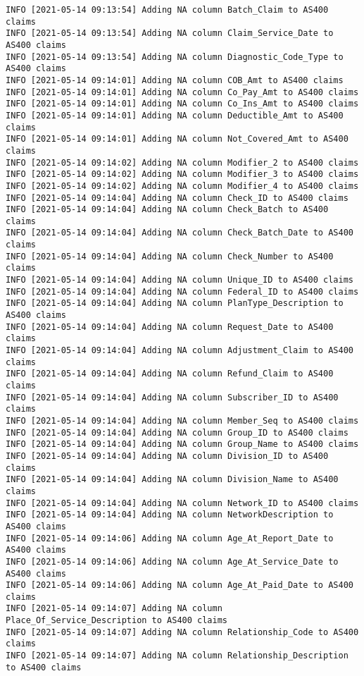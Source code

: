 \documentclass[
]{book}
\begin{document}
\begin{verbatim}
INFO [2021-05-14 09:13:54] Adding NA column Batch_Claim to AS400 claims
INFO [2021-05-14 09:13:54] Adding NA column Claim_Service_Date to AS400 claims
INFO [2021-05-14 09:13:54] Adding NA column Diagnostic_Code_Type to AS400 claims
INFO [2021-05-14 09:14:01] Adding NA column COB_Amt to AS400 claims
INFO [2021-05-14 09:14:01] Adding NA column Co_Pay_Amt to AS400 claims
INFO [2021-05-14 09:14:01] Adding NA column Co_Ins_Amt to AS400 claims
INFO [2021-05-14 09:14:01] Adding NA column Deductible_Amt to AS400 claims
INFO [2021-05-14 09:14:01] Adding NA column Not_Covered_Amt to AS400 claims
INFO [2021-05-14 09:14:02] Adding NA column Modifier_2 to AS400 claims
INFO [2021-05-14 09:14:02] Adding NA column Modifier_3 to AS400 claims
INFO [2021-05-14 09:14:02] Adding NA column Modifier_4 to AS400 claims
INFO [2021-05-14 09:14:04] Adding NA column Check_ID to AS400 claims
INFO [2021-05-14 09:14:04] Adding NA column Check_Batch to AS400 claims
INFO [2021-05-14 09:14:04] Adding NA column Check_Batch_Date to AS400 claims
INFO [2021-05-14 09:14:04] Adding NA column Check_Number to AS400 claims
INFO [2021-05-14 09:14:04] Adding NA column Unique_ID to AS400 claims
INFO [2021-05-14 09:14:04] Adding NA column Federal_ID to AS400 claims
INFO [2021-05-14 09:14:04] Adding NA column PlanType_Description to AS400 claims
INFO [2021-05-14 09:14:04] Adding NA column Request_Date to AS400 claims
INFO [2021-05-14 09:14:04] Adding NA column Adjustment_Claim to AS400 claims
INFO [2021-05-14 09:14:04] Adding NA column Refund_Claim to AS400 claims
INFO [2021-05-14 09:14:04] Adding NA column Subscriber_ID to AS400 claims
INFO [2021-05-14 09:14:04] Adding NA column Member_Seq to AS400 claims
INFO [2021-05-14 09:14:04] Adding NA column Group_ID to AS400 claims
INFO [2021-05-14 09:14:04] Adding NA column Group_Name to AS400 claims
INFO [2021-05-14 09:14:04] Adding NA column Division_ID to AS400 claims
INFO [2021-05-14 09:14:04] Adding NA column Division_Name to AS400 claims
INFO [2021-05-14 09:14:04] Adding NA column Network_ID to AS400 claims
INFO [2021-05-14 09:14:04] Adding NA column NetworkDescription to AS400 claims
INFO [2021-05-14 09:14:06] Adding NA column Age_At_Report_Date to AS400 claims
INFO [2021-05-14 09:14:06] Adding NA column Age_At_Service_Date to AS400 claims
INFO [2021-05-14 09:14:06] Adding NA column Age_At_Paid_Date to AS400 claims
INFO [2021-05-14 09:14:07] Adding NA column Place_Of_Service_Description to AS400 claims
INFO [2021-05-14 09:14:07] Adding NA column Relationship_Code to AS400 claims
INFO [2021-05-14 09:14:07] Adding NA column Relationship_Description to AS400 claims

\end{verbatim}
\end{document}
